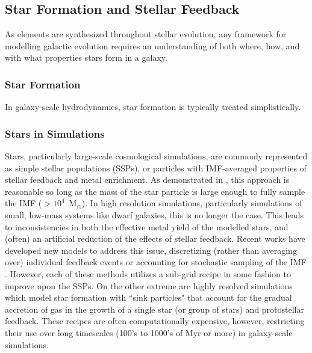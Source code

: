 \subsection{Star Formation and Stellar Feedback}\label{sec:section1}

As elements are synthesized throughout stellar evolution, any framework for modelling galactic evolution requires an understanding of both where, how, and with what properties stars form in a galaxy. 

\subsubsection{Star Formation}

In galaxy-scale hydrodynamics, star formation is typically treated simplistically.


\subsubsection{Stars in Simulations}

Stars, particularly large-scale cosmological simulations, are commonly represented as simple stellar populations (SSPs), or particles with IMF-averaged properties of stellar feedback and metal enrichment. As demonstrated in \cite{Revaz2016}, this approach is reasonable so long as the mass of the star particle is large enough to fully sample the IMF ($> 10^{4}$~M$_{\odot}$). In high resolution simulations, particularly simulations of small, low-mass systems like dwarf galaxies, this is no longer the case. This leads to inconsistencies in both the effective metal yield of the modelled stars, and (often) an artificial reduction of the effects of stellar feedback. Recent works have developed new models to address this issue, discretizing (rather than averaging over) individual feedback events \citep[e.g.][]{MUGS2010,FIRE,Hopkins2018,Rosdahl2018} or accounting for stochastic sampling of the IMF \citep{Hu2016,Hu2017,Applebaum2018,Su2018}. However, each of these methods utilizes a sub-grid recipe in some fashion to improve upon the SSPs. On the other extreme are highly resolved simulations which model star formation with ``sink particles" \citep[see for example ][]{Krumholz2004,Federrath2010,GongOstriker2013,BleulerTeyssier2014,Sormani2017} that account for the gradual accretion of gas in the growth of a single star (or group of stars) and protostellar feedback. These recipes are often computationally expensive, however, restricting their use over long timescales (100's to 1000's of Myr or more) in galaxy-scale simulations.


